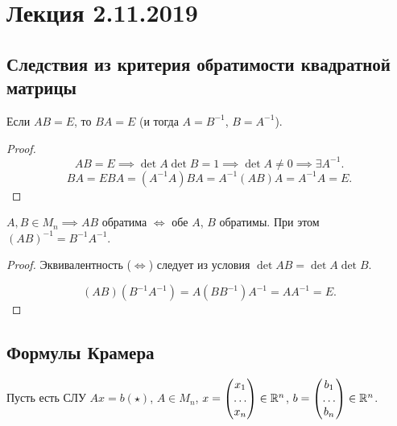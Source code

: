 \section{Лекция 2.11.2019}


\subsection{Следствия из критерия обратимости квадратной матрицы}

\begin{corollary}
    Если $AB = E$, то $BA = E$ (и тогда $A = B^{-1}$, $B = A^{-1}$).
\end{corollary}

\begin{proof}
    \label{proof:ab_inverse}
    \begin{equation*}
        AB = E \implies \det A \det B = 1 \implies \det A \neq 0 \implies \exists A^{-1}
    .\end{equation*}
    \begin{equation*}
        BA = EBA = (A^{-1}A)BA = A^{-1}(AB)A = A^{-1}A = E
    .\end{equation*}
\end{proof}

\begin{corollary}
    $A, B \in M_n \implies AB$ обратима $\iff$ обе $A$, $B$ обратимы. При этом $(AB)^{-1} = B^{-1} A^{-1}$.
\end{corollary}

\begin{proof}
    Эквивалентность ($\iff$) следует из условия $\det AB = \det A \det B$.

    \begin{equation*}
        (AB)(B^{-1}A^{-1}) = A(BB^{-1})A^{-1} = A A^{-1} = E
    .\end{equation*}
\end{proof}

\subsection{Формулы Крамера}

Пусть есть СЛУ $Ax = b (\star)$, $A \in M_n$, $x = \begin{pmatrix} x_1 \\ \dots \\ x_n \end{pmatrix} \in \mathbb{R}^n$, $b = \begin{pmatrix} b_1 \\ \dots \\ b_n \end{pmatrix} \in \mathbb{R}^n$.

